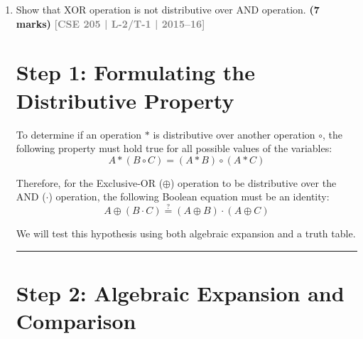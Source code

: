 \documentclass[12pt,a3paper]{article}
\newcommand{\yr}[1]{\hfill\textcolor{gray}{\small\textbf{[#1]}}}
\newcommand{\mk}[1]{\textcolor{orange!70!black}{\small\textbf{(#1 marks)}}}
\begin{document}
\begin{enumerate}
\begin{tcolorbox}[enhanced,breakable,ansbox,colback=cA!4,colframe=cA,boxrule=0.8pt,arc=5pt,title={\textbf{Answer}},fonttitle=\bfseries\color{white},colbacktitle=cA]
\section*{Step 4: Conclusion}

Comparing the results from Step 2 and Step 3:
\begin{align*}
    f^D(A, B) &= AB + \bar{A}\bar{B} \\
    \overline{f(A, B)} &= AB + \bar{A}\bar{B}
\end{align*}

Since $f^D(A, B) = \overline{f(A, B)}$, we have successfully demonstrated that the \textbf{dual of the Exclusive-OR operation is mathematically identical to its complement}.

\end{tcolorbox}

\item Show that XOR operation is not distributive over AND operation.
\mk{7} \yr{CSE 205 | L-2/T-1 | 2015--16}

\begin{tcolorbox}[enhanced,breakable,ansbox,colback=cA!4,colframe=cA,boxrule=0.8pt,arc=5pt,title={\textbf{Answer}},fonttitle=\bfseries\color{white},colbacktitle=cA]

\section*{Step 1: Formulating the Distributive Property}

To determine if an operation $\ast$ is distributive over another operation $\circ$, the following property must hold true for all possible values of the variables:
\[ A \ast (B \circ C) = (A \ast B) \circ (A \ast C) \]

Therefore, for the Exclusive-OR ($\oplus$) operation to be distributive over the AND ($\cdot$) operation, the following Boolean equation must be an identity:
\begin{equation}
    A \oplus (B \cdot C) \stackrel{?}{=} (A \oplus B) \cdot (A \oplus C)
\end{equation}

We will test this hypothesis using both algebraic expansion and a truth table.

\vspace{0.2cm}
\hrule
\vspace{0.4cm}

\section*{Step 2: Algebraic Expansion and Comparison}


\end{tcolorbox}
\end{enumerate}
\end{document}
